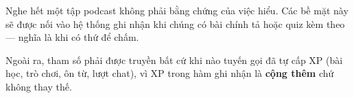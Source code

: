 \begin{luuy}
Nghe hết một tập podcast không phải bằng chứng của việc hiểu. Các bề mặt này sẽ được nối
vào hệ thống ghi nhận khi chúng có bài chính tả hoặc quiz kèm theo — nghĩa là khi có thứ
để chấm.
\end{luuy}

Ngoài ra, tham số  phải được truyền bất cứ khi nào tuyến gọi đã tự
cấp XP (bài học, trò chơi, ôn từ, lượt chat), vì XP trong hàm ghi nhận là \textbf{cộng
thêm} chứ không thay thế.

